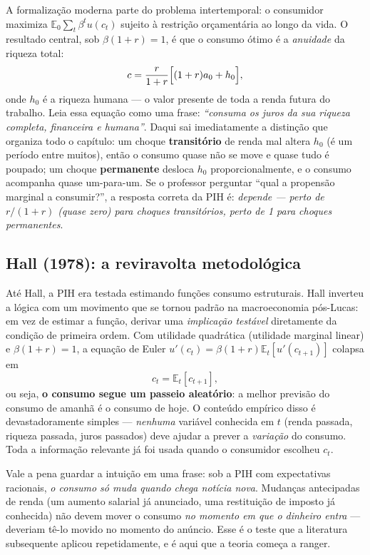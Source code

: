 \documentclass[11pt,a4paper]{article}
\newcommand{\E}{\mathbb{E}}
\newcommand{\ideia}[1]{\textcolor{destaque}{\textbf{#1}}}
\begin{document}
A formalização moderna parte do problema intertemporal: o consumidor
maximiza $\E_0 \sum_t \beta^t u(c_t)$ sujeito à restrição orçamentária
ao longo da vida. O resultado central, sob $\beta(1+r)=1$, é que o
consumo ótimo é a \emph{anuidade} da riqueza total:
\[
  c = \frac{r}{1+r}\Bigl[(1+r)a_0 + h_0\Bigr],
\]
onde $h_0$ é a riqueza humana --- o valor presente de toda a renda
futura do trabalho. Leia essa equação como uma frase: \emph{``consuma os
juros da sua riqueza completa, financeira e humana''}. Daqui sai
imediatamente a distinção que organiza todo o capítulo: um choque
\ideia{transitório} de renda mal altera $h_0$ (é um período entre
muitos), então o consumo quase não se move e quase tudo é poupado; um
choque \ideia{permanente} desloca $h_0$ proporcionalmente, e o consumo
acompanha quase um-para-um. Se o professor perguntar ``qual a propensão
marginal a consumir?'', a resposta correta da PIH é: \emph{depende ---
perto de $r/(1+r)$ (quase zero) para choques transitórios, perto de 1
para choques permanentes}.

\subsection{Hall (1978): a reviravolta metodológica}

Até Hall, a PIH era testada estimando funções consumo estruturais. Hall
inverteu a lógica com um movimento que se tornou padrão na
macroeconomia pós-Lucas: em vez de estimar a função, derivar uma
\emph{implicação testável} diretamente da condição de primeira ordem.
Com utilidade quadrática (utilidade marginal linear) e $\beta(1+r)=1$,
a equação de Euler $u'(c_t) = \beta(1+r)\E_t[u'(c_{t+1})]$ colapsa em
\[
  c_t = \E_t[c_{t+1}],
\]
ou seja, \ideia{o consumo segue um passeio aleatório}: a melhor previsão
do consumo de amanhã é o consumo de hoje. O conteúdo empírico disso é
devastadoramente simples --- \emph{nenhuma} variável conhecida em $t$
(renda passada, riqueza passada, juros passados) deve ajudar a prever a
\emph{variação} do consumo. Toda a informação relevante já foi usada
quando o consumidor escolheu $c_t$.

Vale a pena guardar a intuição em uma frase: sob a PIH com expectativas
racionais, \emph{o consumo só muda quando chega notícia nova}. Mudanças
antecipadas de renda (um aumento salarial já anunciado, uma restituição
de imposto já conhecida) não devem mover o consumo \emph{no momento em
que o dinheiro entra} --- deveriam tê-lo movido no momento do anúncio.
Esse é o teste que a literatura subsequente aplicou repetidamente, e é
aqui que a teoria começa a ranger.
\end{document}

